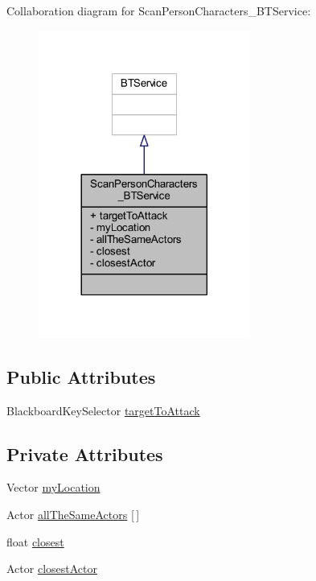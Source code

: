 Collaboration diagram for Scan\+Person\+Characters\+\_\+\+B\+T\+Service\+:
\nopagebreak
\begin{figure}[H]
\begin{center}
\leavevmode
\includegraphics[width=197pt]{class_scan_person_characters___b_t_service__coll__graph}
\end{center}
\end{figure}
\subsection*{Public Attributes}
\begin{DoxyCompactItemize}
\item 
Blackboard\+Key\+Selector \hyperlink{class_scan_person_characters___b_t_service_a9c34e715ea6da29e92ca7001672c9115}{target\+To\+Attack}
\end{DoxyCompactItemize}
\subsection*{Private Attributes}
\begin{DoxyCompactItemize}
\item 
Vector \hyperlink{class_scan_person_characters___b_t_service_a10ae41992fbbf06fe2c12af19d65fbd9}{my\+Location}
\item 
Actor \hyperlink{class_scan_person_characters___b_t_service_ab4cebfb967515e3be3752350e270254f}{all\+The\+Same\+Actors} \mbox{[}$\,$\mbox{]}
\item 
float \hyperlink{class_scan_person_characters___b_t_service_a3ac0ee90b48bc64bb65a64f28aaa14a9}{closest}
\item 
Actor \hyperlink{class_scan_person_characters___b_t_service_afc2312ea58e9f0e017001c6ad46321f2}{closest\+Actor}
\end{DoxyCompactItemize}


